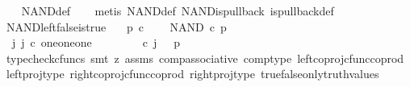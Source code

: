\begin{isabellebody}
%
\isadelimproof
\ \ %
\endisadelimproof
%
\isatagproof
{}\isamarkupfalse%
\ NAND{\isacharunderscore}{\kern0pt}def\isanewline
\ \ \isamarkupfalse%
\ {\isacharparenleft}{\kern0pt}metis\ NAND{\isacharunderscore}{\kern0pt}def\ NAND{\isacharunderscore}{\kern0pt}is{\isacharunderscore}{\kern0pt}pullback\ is{\isacharunderscore}{\kern0pt}pullback{\isacharunderscore}{\kern0pt}def{\isacharparenright}{\kern0pt}%
\endisatagproof
{\isafoldproof}%
%
\isadelimproof
\ \isanewline
%
\endisadelimproof
\isanewline
{}\isamarkupfalse%
\ NAND{\isacharunderscore}{\kern0pt}left{\isacharunderscore}{\kern0pt}false{\isacharunderscore}{\kern0pt}is{\isacharunderscore}{\kern0pt}true{\isacharcolon}{\kern0pt}\isanewline
\ \ \ {\isachardoublequoteopen}p\ {\isasymin}\isactrlsub c\ {\isasymOmega}{\isachardoublequoteclose}\isanewline
\ \ \ {\isachardoublequoteopen}NAND\ {\isasymcirc}\isactrlsub c\ {\isasymlangle}{\isasymf}{\isacharcomma}{\kern0pt}p{\isasymrangle}\ {\isacharequal}{\kern0pt}\ {\isasymt}{\isachardoublequoteclose}\isanewline
%
\isadelimproof
%
\endisadelimproof
%
\isatagproof
{}\isamarkupfalse%
\ {\isacharminus}{\kern0pt}\ \isanewline
\ \ \isamarkupfalse%
\ {\isachardoublequoteopen}{\isasymexists}\ j{\isachardot}{\kern0pt}\ j\ {\isasymin}\isactrlsub c\ one{\isasymCoprod}{\isacharparenleft}{\kern0pt}one{\isasymCoprod}one{\isacharparenright}{\kern0pt}\ {\isasymand}\ {\isacharparenleft}{\kern0pt}{\isasymlangle}{\isasymf}{\isacharcomma}{\kern0pt}\ {\isasymf}{\isasymrangle}\ {\isasymamalg}\ {\isacharparenleft}{\kern0pt}{\isasymlangle}{\isasymt}{\isacharcomma}{\kern0pt}\ {\isasymf}{\isasymrangle}\ {\isasymamalg}{\isasymlangle}{\isasymf}{\isacharcomma}{\kern0pt}\ {\isasymt}{\isasymrangle}{\isacharparenright}{\kern0pt}{\isacharparenright}{\kern0pt}\ {\isasymcirc}\isactrlsub c\ j\ \ {\isacharequal}{\kern0pt}\ {\isasymlangle}{\isasymf}{\isacharcomma}{\kern0pt}p{\isasymrangle}{\isachardoublequoteclose}\isanewline
\ \ \ \ \isamarkupfalse%
\ {\isacharparenleft}{\kern0pt}typecheck{\isacharunderscore}{\kern0pt}cfuncs{\isacharcomma}{\kern0pt}\ smt\ {\isacharparenleft}{\kern0pt}z{}{\isacharparenright}{\kern0pt}\ assms\ comp{\isacharunderscore}{\kern0pt}associative{}\ comp{\isacharunderscore}{\kern0pt}type\ left{\isacharunderscore}{\kern0pt}coproj{\isacharunderscore}{\kern0pt}cfunc{\isacharunderscore}{\kern0pt}coprod\ left{\isacharunderscore}{\kern0pt}proj{\isacharunderscore}{\kern0pt}type\ right{\isacharunderscore}{\kern0pt}coproj{\isacharunderscore}{\kern0pt}cfunc{\isacharunderscore}{\kern0pt}coprod\ right{\isacharunderscore}{\kern0pt}proj{\isacharunderscore}{\kern0pt}type\ true{\isacharunderscore}{\kern0pt}false{\isacharunderscore}{\kern0pt}only{\isacharunderscore}{\kern0pt}truth{\isacharunderscore}{\kern0pt}values{\isacharparenright}{\kern0pt}\isanewline

\end{isabellebody}
